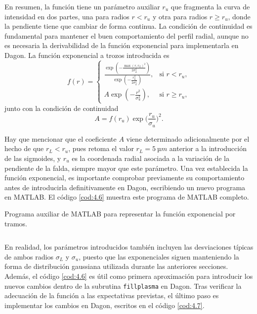 En resumen, la función tiene un parámetro auxiliar $r_{u}$ que fragmenta la curva de intensidad en dos partes, una para radios $r<r_{u}$ y otra para radios $r\geq r_{u}$, donde la pendiente tiene que cambiar de forma continua. La condición de continuidad es fundamental para mantener el buen comportamiento del perfil radial, aunque no es necesaria la derivabilidad de la función exponencial para implementarla en Dagon. La función exponencial a trozos introducida es 
\begin{equation}\label{eq:4.1}
  f(r) =  
  \begin{cases}
    \frac{\exp\left(-\frac{\max(r,r_{L})^{2}}{2 \sigma_{L}^{2}}\right)}{\exp\left(-\frac{r_{L}^{2}}{2 \sigma_{L}^{2}}\right)}, & \text{si $r<r_{u}$}, \\
    A\exp\left(-\frac{r^{2}}{\sigma_{u}^{2}}\right), & \text{si $r\geq r_{u}$},
  \end{cases}
\end{equation}
junto con la condición de continuidad 
\begin{equation}\label{eq:4.2}
  A = f(r_{u})\exp\bigg(\frac{r_{u}}{\sigma_{u}}\bigg)^{2}.
\end{equation}

Hay que mencionar que el coeficiente $A$ viene determinado adicionalmente por el hecho de que $r_{L}<r_{u}$, pues retoma el valor $r_{L}=\qty{5}{µm}$ anterior a la introducción de las sigmoides, y $r_{u}$ es la coordenada radial asociada a la variación de la pendiente de la falda, siempre mayor que este parámetro. Una vez establecida la función exponencial, es importante comprobar previamente su comportamiento antes de introducirla definitivamente en Dagon, escribiendo un nuevo programa en MATLAB. El código \ref{cod:4.6} muestra este programa de MATLAB completo.

\begin{listing}[htbp]
  \caption{Programa auxiliar de MATLAB para representar la función exponencial por tramos.} 
  \inputminted[firstline=1, lastline=27]{matlab}{Programas/f_trozos.m}
  \label{cod:4.6}
\end{listing}

En realidad, los parámetros introducidos también incluyen las desviaciones típicas de ambos radios $\sigma_{L}$ y $\sigma_{u}$, puesto que las exponenciales siguen manteniendo la forma de distribución gaussiana utilizada durante las anteriores secciones. Además, el código \ref{cod:4.6} es útil como primera aproximación para introducir los nuevos cambios dentro de la subrutina \texttt{fillplasma} en Dagon. Tras verificar la adecuación de la función a las expectativas previstas, el último paso es implementar los cambios en Dagon, escritos en el código \ref{cod:4.7}.

